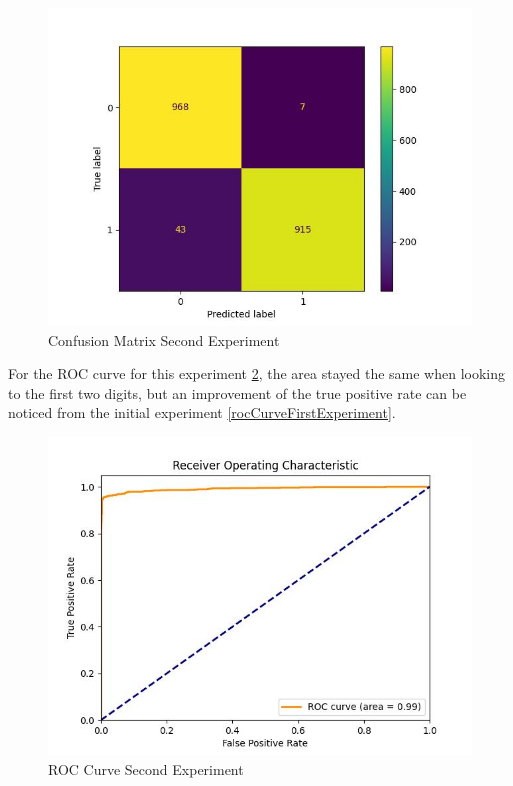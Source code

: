 \documentclass[3p,times,procedia]{elsarticle}
\begin{document}
\begin{figure}[htbp]
	\centering
		\includegraphics[scale=0.8]{./figures/metrics/experiment2English/confusionMatrix.jpg}
	\caption{Confusion Matrix Second Experiment}
	\label{confusionMatriSecondExperiment}
\end{figure}

For the ROC curve for this experiment \ref{rocCurveSecondExperiment}, the area stayed the same when looking to the first two digits, but an improvement of the true positive rate can be noticed from the initial experiment \ref{rocCurveFirstExperiment}.

\begin{figure}[htbp]
	\centering
		\includegraphics[scale=0.8]{./figures/metrics/experiment2English/roc_curve.jpg}
	\caption{ROC Curve Second Experiment}
	\label{rocCurveSecondExperiment}
\end{figure}
\end{document}
